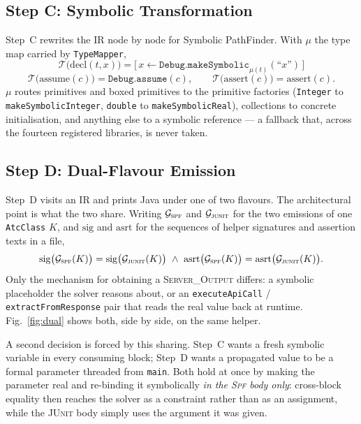 \documentclass[conference]{IEEEtran}
\begin{document}
\subsection{Step C: Symbolic Transformation}

Step~C rewrites the IR node by node for Symbolic PathFinder. With $\mu$ the type map
carried by \texttt{TypeMapper},
\begin{equation}
\mathcal{T}\big(\mathrm{decl}(t,x)\big)=
\big[\,x \leftarrow \texttt{Debug.makeSymbolic}_{\mu(t)}(\text{``}x\text{''})\,\big]
\end{equation}
\begin{equation}
\mathcal{T}\big(\mathrm{assume}(c)\big)=\texttt{Debug.assume}(c),\qquad
\mathcal{T}\big(\mathrm{assert}(c)\big)=\mathrm{assert}(c).
\end{equation}
$\mu$ routes primitives and boxed primitives to the primitive factories
(\texttt{Integer} to \texttt{makeSymbolicInteger}, \texttt{double} to
\texttt{makeSymbolicReal}), collections to concrete initialisation, and anything
else to a symbolic reference --- a fallback that, across the fourteen registered
libraries, is never taken.

\subsection{Step D: Dual-Flavour Emission}

Step~D visits an IR and prints Java under one of two flavours. The architectural
point is what the two share. Writing $\mathcal{G}_{\textsc{spf}}$ and
$\mathcal{G}_{\textsc{junit}}$ for the two emissions of one \texttt{AtcClass} $K$,
and $\mathrm{sig}$ and $\mathrm{asrt}$ for the sequences of helper signatures and
assertion texts in a file,
\begin{equation}
\mathrm{sig}\big(\mathcal{G}_{\textsc{spf}}(K)\big)=\mathrm{sig}\big(\mathcal{G}_{\textsc{junit}}(K)\big)
\ \wedge\
\mathrm{asrt}\big(\mathcal{G}_{\textsc{spf}}(K)\big)=\mathrm{asrt}\big(\mathcal{G}_{\textsc{junit}}(K)\big).
\end{equation}
Only the mechanism for obtaining a \textsc{Server\_Output} differs: a symbolic
placeholder the solver reasons about, or an \texttt{executeApiCall} /
\texttt{extractFromResponse} pair that reads the real value back at runtime.
Fig.~\ref{fig:dual} shows both, side by side, on the same helper.

A second decision is forced by this sharing. Step~C wants a fresh symbolic variable
in every consuming block; Step~D wants a propagated value to be a formal parameter
threaded from \texttt{main}. Both hold at once by making the parameter real and
re-binding it symbolically \emph{in the \textsc{Spf} body only}: cross-block equality
then reaches the solver as a constraint rather than as an assignment, while the
\textsc{JUnit} body simply uses the argument it was given.
\end{document}
